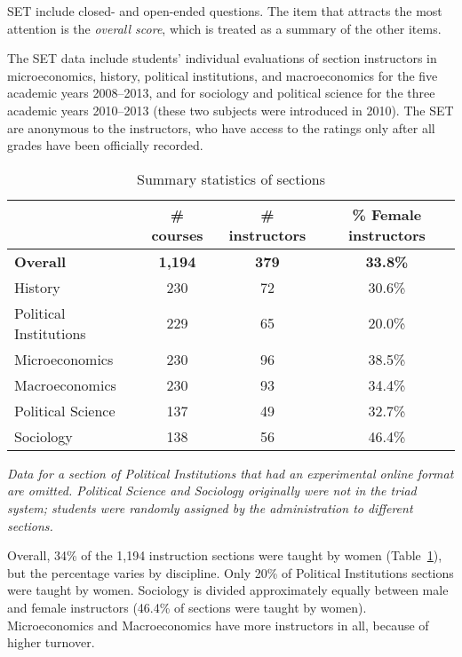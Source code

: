 \documentclass[12pt]{article}
\begin{document}
SET include closed- and open-ended questions.
The item that attracts the most attention is the \emph{overall score}, 
which is treated as a summary of the other items.

The SET data include students' individual evaluations of section
instructors in microeconomics, history, political institutions, and 
macroeconomics for the five academic years 2008--2013, and for 
sociology and political science for the three academic years 2010--2013 
(these two subjects were introduced in 2010). 
The SET are anonymous to the instructors, who have access to the ratings only after 
all grades have been officially recorded.  

\begin{table}[htbp]
  \centering
  \footnotesize 
  \caption{Summary statistics of sections}
    \begin{tabular}{lccc}
    \toprule 
                        & \# courses & \# instructors  & \% Female instructors  \\
   \midrule
  \textbf{Overall} &  \textbf{1,194} & \textbf{379}  &\textbf{33.8\%} \\
    History    &               230 &      72          &   30.6\% \\
    Political Institutions  &  229 &      65          &   20.0\% \\    
    Microeconomics   &         230 &      96          &   38.5\% \\
    Macroeconomics   &         230 &      93          &   34.4\% \\
    Political Science &       137 &      49          &   32.7\% \\
    Sociology   &              138 &      56          &   46.4\%    \\
    \bottomrule
    \end{tabular}%
 \label{tab:description}%
 
\textit{Data for a section of Political Institutions that 
had an experimental online format are omitted.
Political Science and Sociology originally were not in the triad system; 
students were randomly assigned by the administration to different sections.
} 

\end{table}%
\normalsize
Overall, 34\% of the 1,194 instruction sections were taught by women 
(Table~\ref{tab:description}), but the percentage varies by discipline. 
Only 20\% of Political Institutions sections were taught by women. 
Sociology is divided approximately equally between male and female instructors 
(46.4\% of sections were taught by women). 
Microeconomics and Macroeconomics have more instructors in all, because of higher turnover.
\end{document}
